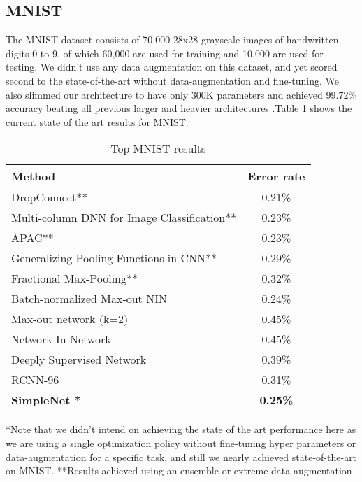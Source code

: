 \documentclass{article} \usepackage{lets_keepit_simple,times}
\begin{document}
\subsection{ MNIST}
The MNIST dataset \cite{Lecun_GradientBased_CNN_1998} consists of 70,000 28x28 grayscale images of handwritten digits 0 to 9, of which 60,000 are used for training and 10,000 are used for testing. We didn't use any data augmentation on this dataset, and yet scored second to the state-of-the-art without data-augmentation and fine-tuning. We also slimmed our architecture to have only 300K parameters and achieved 99.72\% accuracy beating all previous larger and heavier architectures .Table \ref{tab:MNIST} shows the current state of the art results for MNIST.



\begin{table}[H]
\centering
\caption{Top MNIST results}
\label{tab:MNIST}
\begin{tabular}{lc}
\textbf{Method} & \textbf{Error rate} \\ \hline
DropConnect\cite{Wan_Regularization_Using_DropConnect_2013}** & 0.21\% \\
Multi-column DNN for Image Classiﬁcation\cite{Ciregan_Multi_column_dnn_img_cls_2012}**  & 0.23\% \\
APAC\cite{Sato_APAC_2015}** & 0.23\%\\
Generalizing Pooling Functions in CNN\cite{Lee_CNN_Mixed_gated_2016}** & 0.29\%\\
Fractional Max-Pooling\cite{Graham_FractionalMaxpooling_2014}** & 0.32\%\\
Batch-normalized Max-out NIN \cite{JiaRen_BatchNormMaxoutNIN_2015}   & 0.24\%     \\ 
Max-out network (k=2)  \cite{Goodfellow_MaxoutNetwork_2013}          & 0.45\%     \\ 
Network In Network \cite{Lin_NIN_2013}                              & 0.45\%     \\ 
Deeply Supervised Network  \cite{Lee_DeeplySupervisedNet_2015}       & 0.39\%     \\ 
RCNN-96 \cite{Liang_RecurrentCNN_2015}                              & 0.31\%     \\ 
\textbf{SimpleNet *}                               & \textbf{0.25\% }    \\ \hline
\end{tabular}
\end{table}
*Note that we didn't intend on achieving the state of the art performance here as we are using a single optimization policy without fine-tuning hyper parameters or data-augmentation for a specific task, and still we nearly achieved state-of-the-art on MNIST. **Results achieved using an ensemble or extreme data-augmentation
\end{document}
